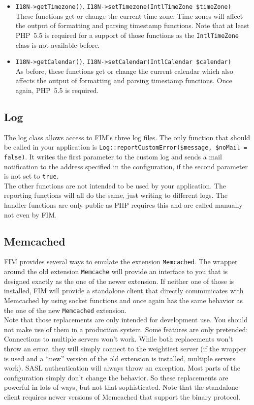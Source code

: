 \documentclass{scrartcl}
\begin{document}
\begin{itemize}
         \item \lstinline!I18N->getTimezone()!, \lstinline!I18N->setTimezone(IntlTimeZone $timeZone)! \\
            These functions get or change the current time zone. Time zones will affect the output of formatting and parsing timestamp functions. Note that at least PHP~5.5 is required for a support of those functions as the \lstinline!IntlTimeZone! class is not available before.
         \item \lstinline!I18N->getCalendar()!, \lstinline!I18N->setCalendar(IntlCalendar $calendar)! \\
            As before, these functions get or change the current calendar which also affects the output of formatting and parsing timestamp functions. Once again, PHP~5.5 is required.
      \end{itemize}
   \subsection{Log}
      The log class allows access to FIM's three log files. The only function that should be called in your application is \lstinline!Log::reportCustomError($message, $noMail = false)!. It writes the first parameter to the custom log and sends a mail notification to the address specified in the configuration, if the second parameter is not set to \lstinline!true!. \\
      The other functions are not intended to be used by your application. The reporting functions will all do the same, just writing to different logs. The handler functions are only public as PHP requires this and are called manually not even by FIM.
   \subsection{Memcached}
      FIM provides several ways to emulate the extension \texttt{Memcached}. The wrapper around the old extension \texttt{Memcache} will provide an interface to you that is designed exactly as the one of the newer extension. If neither one of those is installed, FIM will provide a standalone client that directly communicates with Memcached by using socket functions and once again has the same behavior as the one of the new \texttt{Memcached} extension. \\
      Note that those replacements are only intended for development use. You should not make use of them in a production system. Some features are only pretended: Connections to multiple servers won't work. While both replacements won't throw an error, they will simply connect to the weightiest server (if the wrapper is used and a ``new'' version of the old extension is installed, multiple servers work). SASL authentication will always throw an exception. Most parts of the configuration simply don't change the behavior. So these replacements are powerful in lots of ways, but not that sophisticated. Note that the standalone client requires newer versions of Memcached that support the binary protocol.
\end{document}
